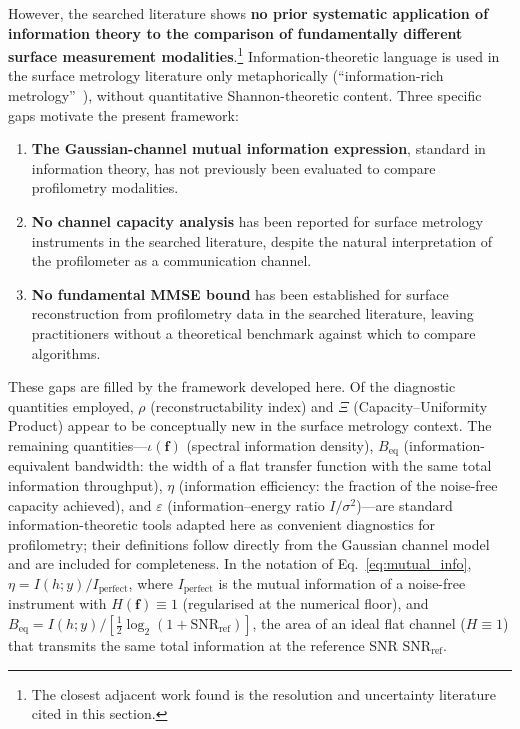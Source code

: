\documentclass[review,12pt]{elsarticle}
\begin{document}
However, the searched literature shows \textbf{no prior systematic application of information theory to the comparison of fundamentally different surface measurement modalities}.\footnote{The closest adjacent work found is the resolution and uncertainty literature cited in this section.} Information-theoretic language is used in the surface metrology literature only metaphorically (``information-rich metrology''~\cite{jiang2007paradigm}), without quantitative Shannon-theoretic content. Three specific gaps motivate the present framework:
\begin{enumerate}
    \item \textbf{The Gaussian-channel mutual information expression}, standard in information theory, has not previously been evaluated to compare profilometry modalities.
    \item \textbf{No channel capacity analysis} has been reported for surface metrology instruments in the searched literature, despite the natural interpretation of the profilometer as a communication channel.
    \item \textbf{No fundamental MMSE bound} has been established for surface reconstruction from profilometry data in the searched literature, leaving practitioners without a theoretical benchmark against which to compare algorithms.
\end{enumerate}
These gaps are filled by the framework developed here. Of the diagnostic quantities employed, $\rho$ (reconstructability index) and $\Xi$ (Capacity--Uniformity Product) appear to be conceptually new in the surface metrology context. The remaining quantities---$\iota(\mathbf{f})$ (spectral information density), $B_\mathrm{eq}$ (information-equivalent bandwidth: the width of a flat transfer function with the same total information throughput), $\eta$ (information efficiency: the fraction of the noise-free capacity achieved), and $\varepsilon$ (information--energy ratio $I/\sigma^2$)---are standard information-theoretic tools adapted here as convenient diagnostics for profilometry; their definitions follow directly from the Gaussian channel model and are included for completeness. In the notation of Eq.~\ref{eq:mutual_info}, $\eta = I(h;y)/I_\mathrm{perfect}$, where $I_\mathrm{perfect}$ is the mutual information of a noise-free instrument with $H(\mathbf{f})\equiv1$ (regularised at the numerical floor), and $B_\mathrm{eq} = I(h;y)/[\tfrac{1}{2}\log_2(1+\mathrm{SNR}_\mathrm{ref})]$, the area of an ideal flat channel ($H\equiv1$) that transmits the same total information at the reference SNR $\mathrm{SNR}_\mathrm{ref}$.
\end{document}
